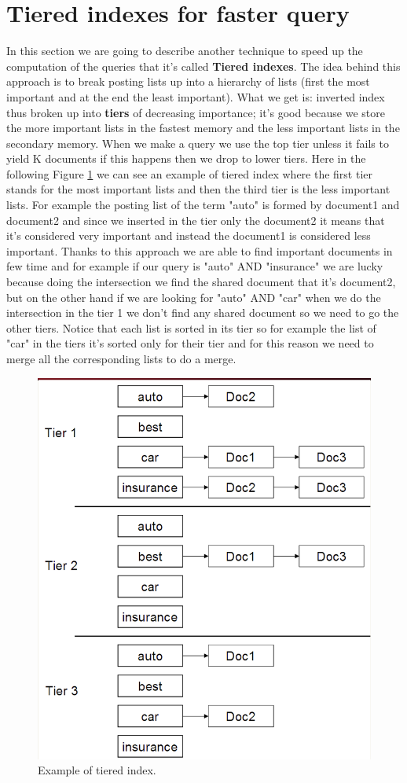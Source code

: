 \section{Tiered indexes for faster query}
In this section we are going to describe another technique to speed up the computation of the queries that it's called \textbf{Tiered indexes}.\newline
The idea behind this approach is to break posting lists up into a hierarchy of lists (first the most important and at the end the least important). What we get is: inverted index thus broken up into \textbf{tiers} of decreasing importance; it's good because we store the more important lists in the fastest memory and the less important lists in the secondary memory.\newline
When we make a query we use the top tier unless it fails to yield K documents if this happens then we drop to lower tiers.\newline
Here in the following Figure \ref{fig:exampletier} we can see an example of tiered index where the first tier stands for the most important lists and then the third tier is the less important lists. For example the posting list of the term "auto" is formed by document1 and document2 and since we inserted in the tier only the document2 it means that it's considered very important and instead the document1 is considered less important. Thanks to this approach we are able to find important documents in few time and for example if our query is "auto" AND "insurance" we are lucky because doing the intersection we find the shared document that it's document2, but on the other hand if we are looking for "auto" AND "car" when we do the intersection in the tier 1 we don't find any shared document so we need to go the other tiers. Notice that each list is sorted in its tier so for example the list of "car" in the tiers it's sorted only for their tier and for this reason we need to merge all the corresponding lists to do a merge.\newline
\begin{figure}
    \centering
    \includegraphics[width=0.75\linewidth]{images/exampletier.png}
    \caption{Example of tiered index.}
    \label{fig:exampletier}
\end{figure}
